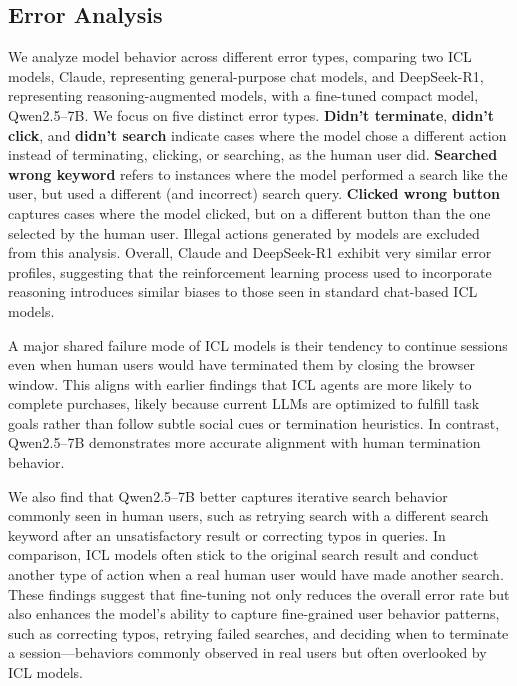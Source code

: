 \documentclass[11pt]{article}
\begin{document}
\subsection{Error Analysis}

We analyze model behavior across different error types, comparing two ICL models, Claude, representing general-purpose chat models, and DeepSeek-R1, representing reasoning-augmented models, with a fine-tuned compact model, Qwen2.5–7B.
We focus on five distinct error types. \textbf{Didn’t terminate}, \textbf{didn’t click}, and \textbf{didn’t search} indicate cases where the model chose a different action instead of terminating, clicking, or searching, as the human user did. \textbf{Searched wrong keyword} refers to instances where the model performed a search like the user, but used a different (and incorrect) search query. \textbf{Clicked wrong button} captures cases where the model clicked, but on a different button than the one selected by the human user.
Illegal actions generated by models are excluded from this analysis.
Overall, Claude and DeepSeek-R1 exhibit very similar error profiles, suggesting that the reinforcement learning process used to incorporate reasoning introduces similar biases to those seen in standard chat-based ICL models.

A major shared failure mode of ICL models is their tendency to continue sessions even when human users would have terminated them by closing the browser window. This aligns with earlier findings that ICL agents are more likely to complete purchases, likely because current LLMs are optimized to fulfill task goals rather than follow subtle social cues or termination heuristics. In contrast, Qwen2.5–7B demonstrates more accurate alignment with human termination behavior.

We also find that Qwen2.5–7B better captures iterative search behavior commonly seen in human users, such as retrying search with a different search keyword after an unsatisfactory result or correcting typos in queries.
In comparison, ICL models often stick to the original search result and conduct another type of action when a real human user would have made another search.
These findings suggest that fine-tuning not only reduces the overall error rate but also enhances the model's ability to capture fine-grained user behavior patterns, such as correcting typos, retrying failed searches, and deciding when to terminate a session—behaviors commonly observed in real users but often overlooked by ICL models.
\end{document}
